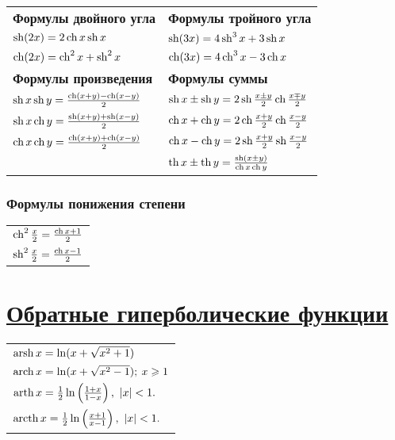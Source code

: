 \begin{longtable}[l]{l l}
{\normalfont\normalsize\bfseries Формулы двойного угла}
&
{\normalfont\normalsize\bfseries Формулы тройного угла}
\\
$\sh (2x) = 2\ch x\sh x$
&
$\sh (3x) = 4\sh^3 x + 3 \sh x$
\\
$\ch (2x) = \ch^2 x + \sh^2 x$
&
$\ch (3x) = 4 \ch^3 x - 3 \ch x$
\\
{\normalfont\normalsize\bfseries Формулы произведения}
&
{\normalfont\normalsize\bfseries Формулы суммы}
\\
$\sh x \sh y = \frac{\ch(x + y) - \ch (x - y)}{2}$
&
$\sh x \pm \sh y = 2 \sh\frac{x \pm y}{2} \ch\frac{x \mp y}{2}$
\\
$\sh x \ch y = \frac{\sh(x + y) + \sh(x - y)}{2}$
&
$\ch x + \ch y = 2 \ch\frac{x + y}{2}\ch\frac{x - y}{2}$
\\
$\ch x \ch y = \frac{\ch(x + y) + \ch(x - y)}{2}$
&
$\ch x - \ch y = 2 \sh\frac{x + y}{2}\sh\frac{x - y}{2}$
\\
&
$\th x \pm \th y = \frac{\sh(x \pm y)}{\ch x \ch y}$
\end{longtable}

\subsubsection{Формулы понижения степени}
\begin{tabular}{l}
$\ch^2 \frac{x}{2} = \frac{\ch x + 1}{2}$
\\
$\sh^2 \frac{x}{2} = \frac{\ch x - 1}{2}$
\end{tabular}

\section[Обратные гиперболические функции]{\href{https://ru.wikipedia.org/wiki/\%D0\%9E\%D0\%B1\%D1\%80\%D0\%B0\%D1\%82\%D0\%BD\%D1\%8B\%D0\%B5_\%D0\%B3\%D0\%B8\%D0\%BF\%D0\%B5\%D1\%80\%D0\%B1\%D0\%BE\%D0\%BB\%D0\%B8\%D1\%87\%D0\%B5\%D1\%81\%D0\%BA\%D0\%B8\%D0\%B5_\%D1\%84\%D1\%83\%D0\%BD\%D0\%BA\%D1\%86\%D0\%B8\%D0\%B8}{Обратные гиперболические функции}}

\begin{tabular}{l}
$\arsh x = \ln(x + \sqrt{x^2 + 1})$
\\
$\arch x = \ln(x + \sqrt{x^2 - 1}); \: x \ge 1$
\\
$\arth x = \frac{1}{2}\ln \left(\frac{1 + x}{1 - x} \right),\ |x|<1.$
\\
$\arcth x = \frac{1}{2}\ln \left( \frac{x+ 1}{x - 1} \right),\ |x|<1.$
\end{tabular}

